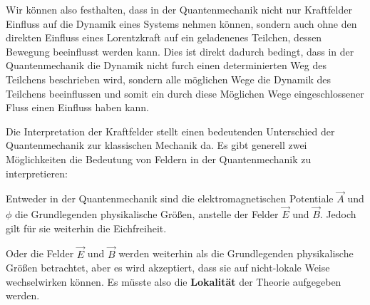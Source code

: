 Wir können also festhalten, dass in der Quantenmechanik nicht nur Kraftfelder Einfluss auf die Dynamik eines Systems nehmen können, sondern auch ohne den direkten Einfluss eines Lorentzkraft auf ein geladenenes Teilchen, dessen Bewegung beeinflusst werden kann. Dies ist direkt dadurch bedingt, dass in der Quantenmechanik die Dynamik nicht furch einen determinierten Weg des Teilchens beschrieben wird, sondern alle möglichen Wege die Dynamik des Teilchens beeinflussen und somit ein durch diese Möglichen Wege eingeschlossener Fluss einen Einfluss haben kann. 

Die Interpretation der Kraftfelder stellt einen bedeutenden Unterschied der Quantenmechanik zur klassischen Mechanik da. Es gibt generell zwei Möglichkeiten die Bedeutung von Feldern in der Quantenmechanik zu interpretieren: 
\begin{itemize1}
\item Entweder in der Quantenmechanik sind die elektromagnetischen Potentiale $\vec{A}$ und $\phi$ die Grundlegenden physikalische Größen, anstelle der Felder $\vec{E}$ und $\vec{B}$. Jedoch gilt für sie weiterhin die Eichfreiheit. 
\item Oder die Felder $\vec{E}$ und $\vec{B}$ werden weiterhin als die Grundlegenden physikalische Größen betrachtet, aber es wird akzeptiert, dass sie auf nicht-lokale Weise wechselwirken können. Es müsste also die {\bf Lokalität} der Theorie aufgegeben werden. 
\end{itemize1}

%
